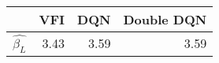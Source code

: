 \begin{tabular}{lrrr}
\toprule
{} &  VFI &  DQN & Double DQN \\
\midrule
$\hat{\beta_L}$ & 3.43 & 3.59 & 3.59 \\
\bottomrule
\end{tabular}